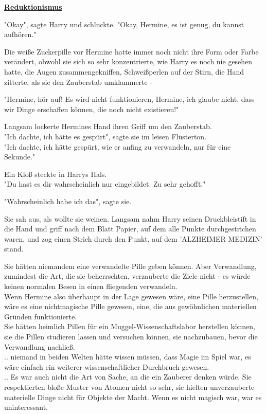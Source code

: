 

\hypertarget{reduktionismus}{%

\textbf{\uline{Reduktionismus}}

"Okay", sagte Harry und schluckte. "Okay, Hermine, es ist genug, du kannst aufhören."

Die weiße Zuckerpille vor Hermine hatte immer noch nicht ihre Form oder Farbe verändert, obwohl sie sich so sehr konzentrierte, wie Harry es noch nie gesehen hatte, die Augen zusammengekniffen, Schweißperlen auf der Stirn, die Hand zitterte, als sie den Zauberstab umklammerte -

"Hermine, hör auf! Es wird nicht funktionieren, Hermine, ich glaube nicht, dass wir Dinge erschaffen können, die noch nicht existieren!"

Langsam lockerte Hermines Hand ihren Griff um den Zauberstab.\\ "Ich dachte, ich hätte es gespürt", sagte sie im leisen Flüsterton.\\ "Ich dachte, ich hätte gespürt, wie er anfing zu verwandeln, nur für eine Sekunde."

Ein Kloß steckte in Harrys Hals.\\ "Du hast es dir wahrscheinlich nur eingebildet. Zu sehr gehofft."

"Wahrscheinlich habe ich das", sagte sie.

Sie sah aus, als wollte sie weinen. Langsam nahm Harry seinen Druckbleistift in die Hand und griff nach dem Blatt Papier, auf dem alle Punkte durchgestrichen waren, und zog einen Strich durch den Punkt, auf dem 'ALZHEIMER MEDIZIN' stand.

Sie hätten niemandem eine verwandelte Pille geben können. Aber Verwandlung, zumindest die Art, die sie beherrschten, verzauberte die Ziele nicht - es würde keinen normalen Besen in einen fliegenden verwandeln.\\ Wenn Hermine also überhaupt in der Lage gewesen wäre, eine Pille herzustellen, wäre es eine nichtmagische Pille gewesen, eine, die aus gewöhnlichen materiellen Gründen funktionierte.\\ Sie hätten heimlich Pillen für ein Muggel-Wissenschaftslabor herstellen können, sie die Pillen studieren lassen und versuchen können, sie nachzubauen, bevor die Verwandlung nachließ.\\ .. niemand in beiden Welten hätte wissen müssen, dass Magie im Spiel war, es wäre einfach ein weiterer wissenschaftlicher Durchbruch gewesen.\\ .. Es war auch nicht die Art von Sache, an die ein Zauberer denken würde. Sie respektierten bloße Muster von Atomen nicht so sehr, sie hielten unverzauberte materielle Dinge nicht für Objekte der Macht. Wenn es nicht magisch war, war es uninteressant.

}
